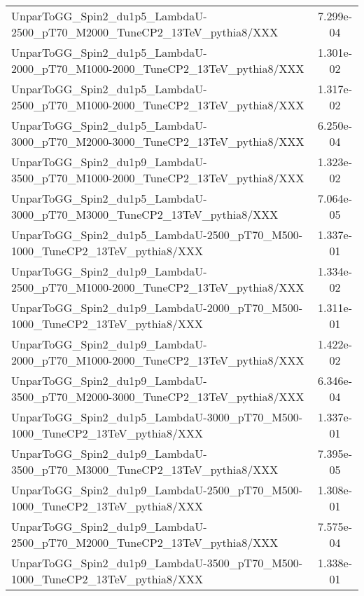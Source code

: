 \begin{landscape}
\begin{table}[!htbp]
\begin{tabular}{lc}
       UnparToGG\_Spin2\_du1p5\_LambdaU-2500\_pT70\_M2000\_TuneCP2\_13TeV\_pythia8/XXX & 7.299e-04\\
       UnparToGG\_Spin2\_du1p5\_LambdaU-2000\_pT70\_M1000-2000\_TuneCP2\_13TeV\_pythia8/XXX & 1.301e-02\\
       UnparToGG\_Spin2\_du1p5\_LambdaU-2500\_pT70\_M1000-2000\_TuneCP2\_13TeV\_pythia8/XXX & 1.317e-02\\
       UnparToGG\_Spin2\_du1p5\_LambdaU-3000\_pT70\_M2000-3000\_TuneCP2\_13TeV\_pythia8/XXX & 6.250e-04\\
       UnparToGG\_Spin2\_du1p9\_LambdaU-3500\_pT70\_M1000-2000\_TuneCP2\_13TeV\_pythia8/XXX & 1.323e-02\\
       UnparToGG\_Spin2\_du1p5\_LambdaU-3000\_pT70\_M3000\_TuneCP2\_13TeV\_pythia8/XXX & 7.064e-05\\
       UnparToGG\_Spin2\_du1p5\_LambdaU-2500\_pT70\_M500-1000\_TuneCP2\_13TeV\_pythia8/XXX & 1.337e-01\\
       UnparToGG\_Spin2\_du1p9\_LambdaU-2500\_pT70\_M1000-2000\_TuneCP2\_13TeV\_pythia8/XXX & 1.334e-02\\
       UnparToGG\_Spin2\_du1p9\_LambdaU-2000\_pT70\_M500-1000\_TuneCP2\_13TeV\_pythia8/XXX & 1.311e-01\\
       UnparToGG\_Spin2\_du1p9\_LambdaU-2000\_pT70\_M1000-2000\_TuneCP2\_13TeV\_pythia8/XXX & 1.422e-02\\
       UnparToGG\_Spin2\_du1p9\_LambdaU-3500\_pT70\_M2000-3000\_TuneCP2\_13TeV\_pythia8/XXX & 6.346e-04\\
       UnparToGG\_Spin2\_du1p5\_LambdaU-3000\_pT70\_M500-1000\_TuneCP2\_13TeV\_pythia8/XXX & 1.337e-01\\
       UnparToGG\_Spin2\_du1p9\_LambdaU-3500\_pT70\_M3000\_TuneCP2\_13TeV\_pythia8/XXX & 7.395e-05\\
       UnparToGG\_Spin2\_du1p9\_LambdaU-2500\_pT70\_M500-1000\_TuneCP2\_13TeV\_pythia8/XXX & 1.308e-01\\
       UnparToGG\_Spin2\_du1p9\_LambdaU-2500\_pT70\_M2000\_TuneCP2\_13TeV\_pythia8/XXX & 7.575e-04\\
       UnparToGG\_Spin2\_du1p9\_LambdaU-3500\_pT70\_M500-1000\_TuneCP2\_13TeV\_pythia8/XXX & 1.338e-01\\

       \hline \hline
       \end{tabular}
       \label{table:Unparticles_signal_samples_xsec_p2}
\end{table}
\end{landscape}
